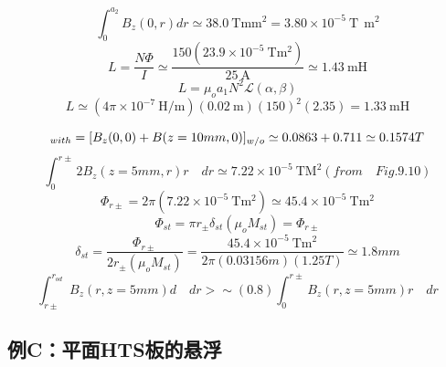 \begin{equation}%
\int_{0}^{a_2}B_z(0,r)dr\simeq38.0\ \mathrm{T mm^2}=3.80\times10^{-5}\ \mathrm{T\ \ m^2}
\end{equation}
\begin{equation}%
L=\frac{N\Phi}{I}\simeq\frac{150(23.9\times10^{-5}\ \mathrm{Tm^2})}{25\ \mathrm{A}}\simeq1.43\ \mathrm{mH}
\end{equation}
\begin{equation}%
L=\mu_oa_1N^2\mathcal{L}(\alpha,\beta)
\end{equation}
\begin{equation}%
L\simeq(4\pi\times10^{-7}\ \mathrm{H/m})(0.02\ \mathrm{m})(150)^2(2.35)=1.33\ \mathrm{mH}
\end{equation}




\begin{equation}%
[B_{z}(0,0)]_{with}=[B_{z}(0,0)+B(z=10mm,0)]_{w/o}\\
\simeq0.0863+0.711\simeq0.1574T
\end{equation}
\begin{equation}%
\int_{0}^{r\pm}2B_{z}(z=5mm,r)r\quad dr\simeq7.22\times10^{-5}\ \mathrm{TM^{2}}(from\quad Fig.9.10)
\end{equation}
\begin{equation}%
\Phi_{r\pm}=2\pi(7.22\times10^{-5}\ \mathrm{Tm^{2}})\simeq45.4\times10^{-5}\ \mathrm{Tm^{2}}
\end{equation}
\begin{equation}%
\Phi_{st}=\pi r_{\pm}\delta_{st}(\mu_{o}M_{st})=\Phi_{r\pm}
\end{equation}
\begin{equation}%
\delta_{st}=\frac{\Phi_{r\pm}}{2r_{\pm}(\mu_{o}M_{st})}=\frac{45.4\times10^{-5}\ \mathrm{Tm^{2}}}{2\pi(0.03156m)(1.25T)}\simeq1.8mm
\end{equation}
\begin{equation}%
\int_{r\pm}^{r_{od}}B_{z}(r,z=5mm)d\quad dr>\sim(0.8)\int_{0}^{r\pm}B_{z}(r,z=5mm)r\quad dr
\end{equation}



\subsection{例C：平面HTS板的悬浮}

